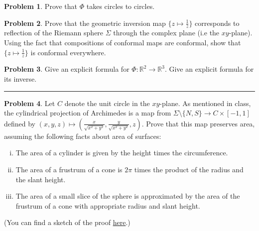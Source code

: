 \documentclass{amsart}
\newcommand{\+}[1]{\ensuremath{\mathbf{#1}}}
\newcommand{\R}{{\mathbb R}}
\theoremstyle{definition}
\newtheorem{prob}{Problem}
\begin{document}
\begin{prob}
 Prove that $\Phi$ takes circles to circles.
\end{prob}

\begin{prob}
 Prove that the geometric inversion map $\{z \mapsto \frac{1}{\bar{z}}\}$ corresponds to 
 reflection of the Riemann sphere $\Sigma$ through the complex plane (i.e the $xy$-plane).
 Using the fact that compositions of conformal maps are conformal, show
 that $\{z \mapsto \frac{1}{z}\}$ is conformal everywhere.
\end{prob}

\begin{prob}
 Give an explicit formula for $\Phi: \R^2 \to \R^3$.  Give an explicit formula for its inverse.
\end{prob}

\vspace{5mm}

\hrule

\vspace{5mm}

\begin{prob}
Let $C$ denote the unit circle in the $xy$-plane.
 As mentioned in class, the cylindrical projection of Archimedes is a map from $\Sigma \setminus \{N,S\} \to C \times [-1,1]$
 defined by $(x,y,z) \mapsto (\frac{x}{\sqrt{x^2+y^2}},\frac{y}{\sqrt{x^2+y^2}},z)$.
 Prove that this map preserves area, assuming the following facts about area of surfaces:
 \begin{enumerate}[(i)]
\item The area of a cylinder is given by the height times the circumference.
\item The area of a frustrum of a cone is $2\pi$ times the product of the radius and the slant height.
\item The area of a small slice of the sphere is approximated by the area of the frustrum of a cone with appropriate radius and slant height.
\end{enumerate}
(You can find a sketch of the proof \href{http://www.cmi.ac.in/~vijayr/analysis_2018spring/projections.pdf}{here}.)
\end{prob}
\end{document}
